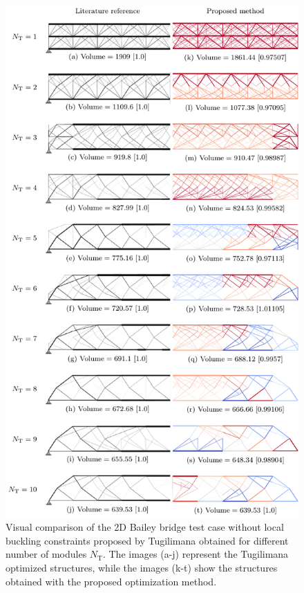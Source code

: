 \begin{figure}
    \centering
    \includegraphics{figures/06_DMO/00_tug_bench/bench.pdf}
    \caption{Visual comparison of the 2D Bailey bridge test case without local buckling constraints proposed by Tugilimana \etal \cite{tugilimana_integrated_2019} obtained for different number of modules $N_\text{T}$. The images (a-j) represent the Tugilimana optimized structures, while the images (k-t) show the structures obtained with the proposed optimization method.}
    \label{fig:00_tug_bench}
\end{figure}


